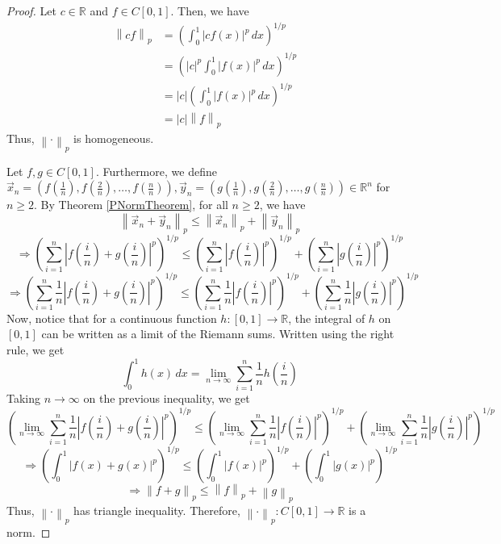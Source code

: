 \documentclass{article}
\newcommand{\longimplies}{\Longrightarrow}
\newcommand{\R}{\mathbb{R}}
\newcommand{\norm}[1]{\left\|#1\right\|}
\theoremstyle{plain} %
\numberwithin{thm}{section} %
\theoremstyle{definition} %
\begin{document}
\begin{proof}
 Let $c \in \R$ and $f \in C[0, 1]$. Then, we have
\begin{align*}
    \norm{cf}_p
    &= \left(\int_0^1 |cf(x)|^p \,dx \right)^{1/p} &\\
    &= \left(|c|^p\int_0^1 |f(x)|^p \,dx \right)^{1/p} &\\
    &= |c|\left(\int_0^1 |f(x)|^p \,dx \right)^{1/p} &\\
    &= |c|\norm{f}_p
\end{align*}
Thus, $\norm{\cdot}_p$ is homogeneous.

 Let $f, g \in C[0, 1]$. Furthermore, we define $\vec{x}_n = (f(\frac{1}{n}), f(\frac{2}{n}), \dots, f(\frac{n}{n})), \vec{y}_n = (g(\frac{1}{n}), g(\frac{2}{n}), \dots, g(\frac{n}{n})) \in \R^n$ for $n \geq 2$. By Theorem \ref{PNormTheorem}, for all $n \geq 2$, we have
\[
    \norm{\vec{x}_n + \vec{y}_n}_p \leq \norm{\vec{x}_n}_p + \norm{\vec{y}_n}_p
\]
\[
\longimplies \left(\sum_{i = 1}^n \left|f\left(\frac{i}{n}\right) + g\left(\frac{i}{n}\right)\right|^p\right)^{1/p} \leq \left(\sum_{i = 1}^n \left|f\left(\frac{i}{n}\right)\right|^p\right)^{1/p} + \left(\sum_{i = 1}^n \left|g\left(\frac{i}{n}\right)\right|^p\right)^{1/p}
\]
\[
\longimplies \left(\sum_{i = 1}^n \frac{1}{n}\left|f\left(\frac{i}{n}\right) + g\left(\frac{i}{n}\right)\right|^p\right)^{1/p} \leq \left(\sum_{i = 1}^n \frac{1}{n}\left|f\left(\frac{i}{n}\right)\right|^p\right)^{1/p} + \left(\sum_{i = 1}^n \frac{1}{n}\left|g\left(\frac{i}{n}\right)\right|^p\right)^{1/p}
\]
Now, notice that for a continuous function $h: [0, 1] \to \R$, the integral of $h$ on $[0, 1]$ can be written as a limit of the Riemann sums. Written using the right rule, we get
\[
    \int_0^1 h(x) \,dx = \lim_{n \to \infty}\sum_{i = 1}^n \frac{1}{n} h\left(\frac{i}{n}\right)
\]
Taking $n \to \infty$ on the previous inequality, we get
\[
    \left(\lim_{n \to \infty}\sum_{i = 1}^n \frac{1}{n}\left|f\left(\frac{i}{n}\right) + g\left(\frac{i}{n}\right)\right|^p\right)^{1/p} \leq \left(\lim_{n \to \infty}\sum_{i = 1}^n \frac{1}{n}\left|f\left(\frac{i}{n}\right)\right|^p\right)^{1/p} + \left(\lim_{n \to \infty}\sum_{i = 1}^n \frac{1}{n}\left|g\left(\frac{i}{n}\right)\right|^p\right)^{1/p}
\]
\[
\longimplies \left(\int_0^1 |f(x) + g(x)|^p\right)^{1/p} \leq \left(\int_0^1 |f(x)|^p\right)^{1/p} + \left(\int_0^1|g(x)|^p\right)^{1/p}
\]
\[
\longimplies \norm{f + g}_p \leq \norm{f}_p + \norm{g}_p
\]
Thus, $\norm{\cdot}_p$ has triangle inequality. Therefore, $\norm{\cdot}_p: C[0, 1] \to \R$ is a norm.

\end{proof}
\end{document}
